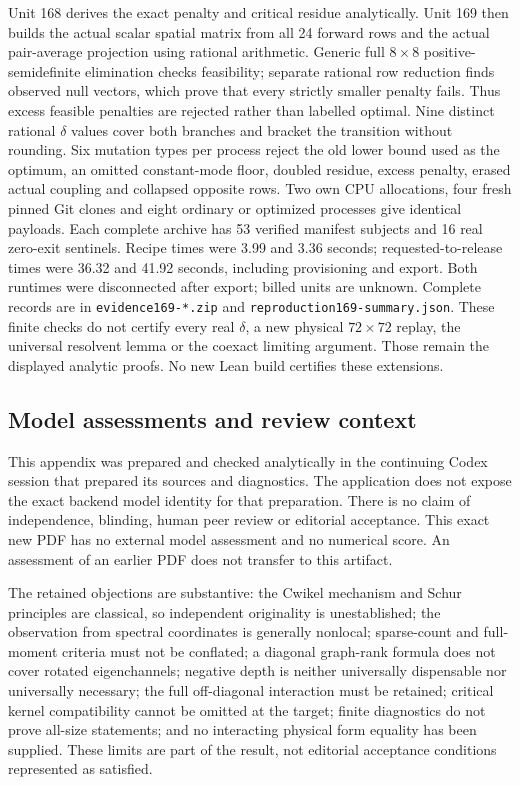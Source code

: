 \documentclass[11pt]{article}
\begin{document}
Unit 168 derives the exact penalty and critical residue analytically.
Unit 169 then builds the actual scalar spatial matrix from all 24 forward
rows and the actual pair-average projection using rational arithmetic.
Generic full $8\times8$ positive-semidefinite elimination checks feasibility;
separate rational row reduction finds observed null vectors, which prove
that every strictly smaller penalty fails. Thus excess feasible penalties
are rejected rather than labelled optimal. Nine distinct rational
$\delta$ values cover both branches and bracket the transition without
rounding. Six mutation types per process reject the old lower bound used
as the optimum, an omitted constant-mode floor, doubled residue, excess
penalty, erased actual coupling and collapsed opposite rows.
Two own CPU allocations, four fresh pinned Git clones and eight ordinary
or optimized processes give identical payloads. Each complete archive has
53 verified manifest subjects and 16 real zero-exit sentinels. Recipe times
were 3.99 and 3.36 seconds; requested-to-release times were 36.32 and
41.92 seconds, including provisioning and export. Both runtimes were
disconnected after export; billed units are unknown. Complete records are
in \texttt{evidence169-*.zip} and \texttt{reproduction169-summary.json}.
These finite checks do not certify every real $\delta$, a new physical
$72\times72$ replay, the universal resolvent lemma or the coexact limiting
argument. Those remain the displayed analytic proofs. No new Lean build
certifies these extensions.

\subsection{Model assessments and review context}
This appendix was prepared and checked analytically in the continuing Codex
session that prepared its sources and diagnostics. The application does not
expose the exact backend model identity for that preparation. There is no
claim of independence, blinding, human peer review or editorial acceptance.
This exact new PDF has no external model assessment and no numerical score.
An assessment of an earlier PDF does not transfer to this artifact.

The retained objections are substantive: the Cwikel mechanism and Schur
principles are classical, so independent originality is unestablished; the
observation from spectral coordinates is generally nonlocal; sparse-count
and full-moment criteria must not be conflated; a diagonal graph-rank formula
does not cover rotated eigenchannels; negative depth is neither universally
dispensable nor universally necessary; the full off-diagonal interaction must
be retained; critical kernel compatibility cannot be omitted at the target; finite diagnostics do not prove all-size statements; and no
interacting physical form equality has been supplied. These limits are part
of the result, not editorial acceptance conditions represented as satisfied.
\end{document}
